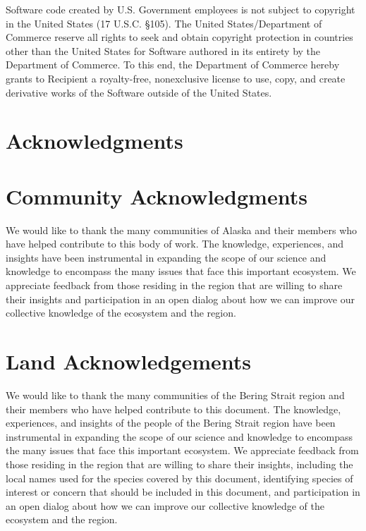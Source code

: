\documentclass[
  letterpaper,
  oneside,
  open=any]{scrbook}
\begin{document}
Software code created by U.S. Government employees is not subject to
copyright in the United States (17 U.S.C. §105). The United
States/Department of Commerce reserve all rights to seek and obtain
copyright protection in countries other than the United States for
Software authored in its entirety by the Department of Commerce. To this
end, the Department of Commerce hereby grants to Recipient a
royalty-free, nonexclusive license to use, copy, and create derivative
works of the Software outside of the United States.

\hypertarget{acknowledgments}{%
\chapter{Acknowledgments}\label{acknowledgments}}

\hypertarget{community-acknowledgments}{%
\chapter{Community Acknowledgments}\label{community-acknowledgments}}

We would like to thank the many communities of Alaska and their members
who have helped contribute to this body of work. The knowledge,
experiences, and insights have been instrumental in expanding the scope
of our science and knowledge to encompass the many issues that face this
important ecosystem. We appreciate feedback from those residing in the
region that are willing to share their insights and participation in an
open dialog about how we can improve our collective knowledge of the
ecosystem and the region.

\hypertarget{land-acknowledgements}{%
\chapter{Land Acknowledgements}\label{land-acknowledgements}}

We would like to thank the many communities of the Bering Strait region
and their members who have helped contribute to this document. The
knowledge, experiences, and insights of the people of the Bering Strait
region have been instrumental in expanding the scope of our science and
knowledge to encompass the many issues that face this important
ecosystem. We appreciate feedback from those residing in the region that
are willing to share their insights, including the local names used for
the species covered by this document, identifying species of interest or
concern that should be included in this document, and participation in
an open dialog about how we can improve our collective knowledge of the
ecosystem and the region.
\end{document}
